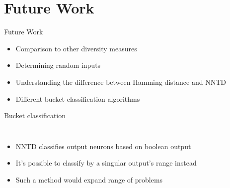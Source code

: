 \section{Future Work}
\begin{frame}{Future Work}
  \begin{itemize}
    \item Comparison to other diversity measures
    \item Determining random inputs %
    \item Understanding the difference between Hamming distance and NNTD
    \item Different bucket classification algorithms
  \end{itemize}
\end{frame}

\begin{frame}{Bucket classification}
  \begin{columns}
    \column{0.5\paperwidth}
    \begin{itemize}
      \item NNTD classifies output neurons based on boolean output
      \item It's possible to classify by a singular output's range instead
      \item Such a method would expand range of problems
    \end{itemize}

    \column{0.5\paperwidth}
    \begin{figure}[htbp]
      \centering
      
    \end{figure}
  \end{columns}
\end{frame}
